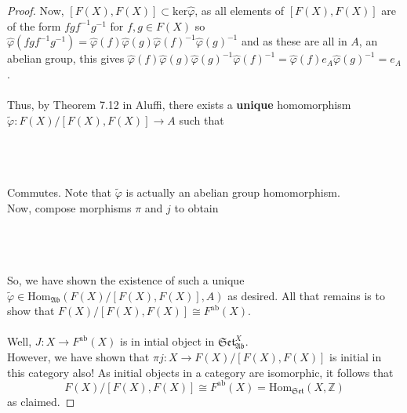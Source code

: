 \documentclass[12pt,letterpaper]{article}
\begin{document}
\begin{proof}
	Now, $[F(X),F(X)] \subset \mathrm{ker}\hat\varphi$, as all elements of $[F(X), F(X)]$ are of the form $fgf^{-1}g^{-1}$ for $f,g\in F(X)$ so $\hat\varphi(fgf^{-1}g^{-1}) = \hat\varphi(f)\hat\varphi(g)\hat\varphi(f)^{-1}\hat\varphi(g)^{-1}$ and as these are all in $A$, an abelian group, this gives $\hat\varphi(f)\hat\varphi(g)\hat\varphi(g)^{-1}\hat\varphi(f)^{-1} = \hat\varphi(f)e_A\hat\varphi(g)^{-1} = e_A$.\\\\
	Thus, by Theorem 7.12 in Aluffi, there exists a \textbf{unique} homomorphism\\ 
	$\tilde\varphi : F(X)/[F(X),F(X)] \rightarrow A$ such that\\\\
		\\\\ 
	Commutes. Note that $\tilde\varphi$ is actually an abelian group homomorphism.\\
	Now, compose morphisms $\pi$ and $j$ to obtain\\\\
		\\\\ 
		
	So, we have shown the existence of such a unique $\tilde\varphi \in \mathrm{Hom}_{\mathfrak{Ab}}(F(X)/[F(X),F(X)], A)$ as desired. All that remains is to show that $F(X)/[F(X),F(X)] \cong F^\text{ab}(X)$.\\\\
	Well, $J:X \rightarrow F^\text{ab}(X)$ is in intial object in $\mathfrak{Set}^X_{\mathfrak{Ab}}$.\\ 
	However, we have shown that $\pi j:X \rightarrow F(X)/[F(X),F(X)]$ is initial in this category also! As initial objects in a category are isomorphic,	it follows that
	\[
	F(X)/[F(X),F(X)] \cong F^\text{ab}(X) = \mathrm{Hom}_{\mathfrak{Set}}(X,\mathbb{Z})
	\] 
	as claimed.
	
\end{proof}
\end{document}
